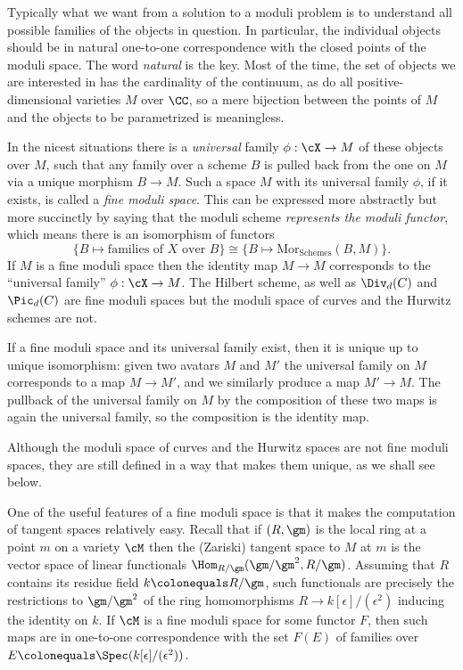 Typically what we want from a solution to a
moduli problem
%
is to
understand all possible families of the objects
in question. In particular, the individual objects should be in natural
%
one-to-one correspondence with the closed points of the
moduli space.  The word \emph{natural} is the key. Most of the time,
the set of objects we are interested in has
the cardinality of the continuum,
as do all positive-dimensional varieties $M$ over $\CC$, so a mere
bijection between the points of $M$ and the objects to be parametrized
is meaningless.

In the nicest situations there is a
\emph{universal} family
%
$\phi:
\cX\to M$ of these objects over $M$,
such that any family over a scheme $B$  is pulled back from the one on
$M$ via a unique morphism $B\to M.$  Such a space $M$ with its universal
family $\phi$, if it exists, is called a \emph{fine moduli space}. This
%
%
can be expressed more abstractly but more succinctly by saying that the
moduli scheme \emph{represents the moduli functor}, which means there
is an isomorphism of functors
$$
\{ B \mapsto \text{families of } X \text{ over } B \} \cong \{ B\mapsto
\mathrm{{Mor}}_{\mathrm{ Schemes}}(B, M) \}.
$$
If $M$ is a fine moduli space then the identity map $M\to M$ corresponds
to the ``universal family'' $\phi: \cX \to M$.
The Hilbert scheme, as well as $\Div_d(C)$ and $\Pic_d(C)$ are fine moduli
spaces but the moduli space of curves
and the Hurwitz schemes are not.

If a fine moduli space and its universal family exist, then it is unique
up to unique isomorphism: given two avatars $M$ and $M'$
the universal family on $M$ corresponds to a map $M\to M'$, and we
similarly produce a map $M'\to M$. The pullback of the universal family
on $M$ by the composition of these two maps is again the universal family,
so the composition is the identity map.

Although the moduli space of curves and the Hurwitz spaces are not fine
moduli spaces, they are still defined
in a way that makes them unique, as we shall see below.

\def\eps{{\epsilon}}
One of the useful features of a fine moduli space is that it makes the
computation of tangent spaces relatively easy.
%
%
Recall that if $(R,\gm)$ is the local ring at a point $m$ on a variety
$\cM$ then the (Zariski) tangent
space to $M$ at $m$ is the vector space of linear functionals
$\Hom_{R/\gm}(\gm/\gm^2, R/\gm)$.   Assuming that
$R$ contains its residue field $k \colonequals  R/\gm$, such functionals
are precisely the restrictions to $\gm/\gm^2$ of the ring homomorphisms
$R \to k[\eps]/(\eps^2)$ inducing the identity on $k$.
 If $\cM$ is a fine moduli space for some functor $F$, then such maps
 are in one-to-one correspondence
with the set $F(E)$ of families over $E \colonequals
\Spec(k[\eps]/(\eps^2))$.

